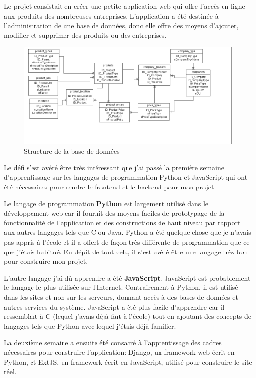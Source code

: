 \documentclass[a4paper,10pt]{report}
\begin{document}
Le projet consistait en créer une petite application web qui offre l'accès en ligne aux
produits des nombreuses entreprises. L'application a \'et\'e destinée à l'administration de une
base de données, donc elle offre des moyens d'ajouter, modifier et supprimer des produits ou des
entreprises.

\begin{figure}[h!]
	\centering
	\caption{Structure de la base de données}
    \includegraphics[scale=0.5]{img/project-database.jpg}
\end{figure}

Le défi s'est avéré être très intéressant que j'ai passé la première semaine d'apprentissage
sur les langages de programmation Python et JavaScript qui ont été nécessaires pour
rendre le frontend et le backend pour mon projet.

Le langage de programmation \textbf{Python} est largement utilisé dans le développement
web car il fournit des moyens faciles de prototypage de la fonctionnalité de l'application
et des constructions de haut niveau par rapport aux autres langages tels que C ou Java.
Python a été quelque chose que je n'avais pas appris à l'école et il a offert de façon
très différente de programmation que ce que j'étais habitué. En dépit de tout cela,
il s'est avéré être une langage très bon pour construire mon projet.

L'autre langage j'ai dû apprendre a été \textbf{JavaScript}. JavaScript est probablement le langage
le plus utilisée sur l'Internet. Contrairement à Python, il est utilisé dans les sites
et non sur les serveurs, donnant accès à des bases de données et autres services du système.
JavaScript a été plus facile d'apprendre car il ressemblait à C (lequel j'avais déjà fait \`a l’école)
tout en ajoutant des concepts de langages tels que Python avec lequel j'étais déjà familier.

La deuxième semaine a ensuite été consacré à l'apprentissage des cadres nécessaires
pour construire l'application: Django, un framework web écrit en Python, et ExtJS,
un framework écrit en JavaScript, utilisé pour construire le site réel.
\end{document}
